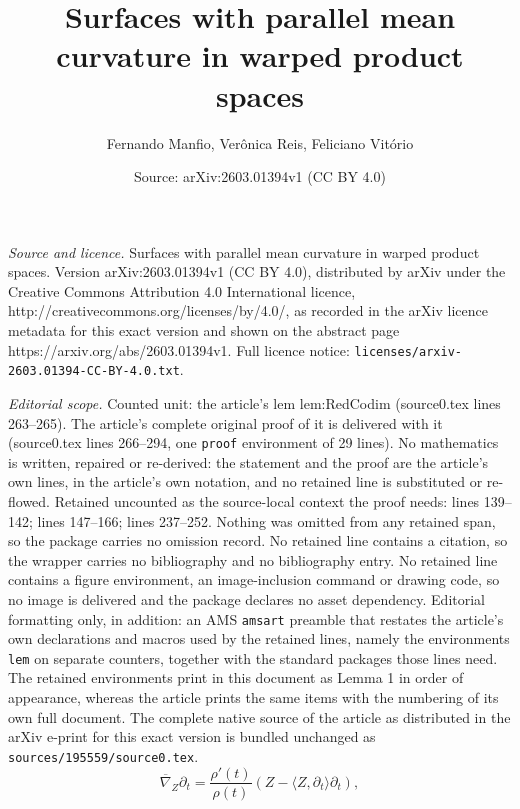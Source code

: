 \documentclass[10pt,a4paper]{amsart}
\title{Surfaces with parallel mean curvature in warped product spaces}
\author{Fernando Manfio, Ver\^onica Reis, Feliciano Vit\'orio}
\date{Source: arXiv:2603.01394v1 (CC BY 4.0)}
\newcommand{\dt}{\partial_t}
\newcommand{\nb}{\overline\nabla}
\newcommand{\pid}{\rangle}
\newcommand{\pie}{\langle}
\begin{document}
\maketitle

\noindent\emph{Source and licence.} Surfaces with parallel mean curvature in warped product spaces. Version arXiv:2603.01394v1 (CC BY 4.0), distributed by arXiv under the Creative Commons Attribution 4.0 International licence, http://creativecommons.org/licenses/by/4.0/, as recorded in the arXiv licence metadata for this exact version and shown on the abstract page https://arxiv.org/abs/2603.01394v1. Full licence notice: \texttt{licenses/arxiv-2603.01394-CC-BY-4.0.txt}.\par\smallskip

\noindent\textit{Editorial scope.} Counted unit: the article's lem lem:RedCodim (source0.tex lines 263--265). The article's complete original proof of it is delivered with it (source0.tex lines 266--294, one \texttt{proof} environment of 29 lines). No mathematics is written, repaired or re-derived: the statement and the proof are the article's own lines, in the article's own notation, and no retained line is substituted or re-flowed.  Retained uncounted as the source-local context the proof needs: lines 139--142; lines 147--166; lines 237--252.  Nothing was omitted from any retained span, so the package carries no omission record.  No retained line contains a citation, so the wrapper carries no bibliography and no bibliography entry.  No retained line contains a figure environment, an image-inclusion command or drawing code, so no image is delivered and the package declares no asset dependency.  Editorial formatting only, in addition: an AMS \texttt{amsart} preamble that restates the article's own declarations and macros used by the retained lines, namely the environments \texttt{lem} on separate counters, together with the standard packages those lines need.  The retained environments print in this document as Lemma 1 in order of appearance, whereas the article prints the same items with the numbering of its own full document.  The complete native source of the article as distributed in the arXiv e-print for this exact version is bundled unchanged as \texttt{sources/195559/source0.tex}.
\begin{equation} \label{eq:Nabladelt}
\nb_Z\dt = \frac{\rho'(t)}{\rho(t)}\left(Z-\pie Z,
\dt\pid\dt\right),
\end{equation}
\end{document}
